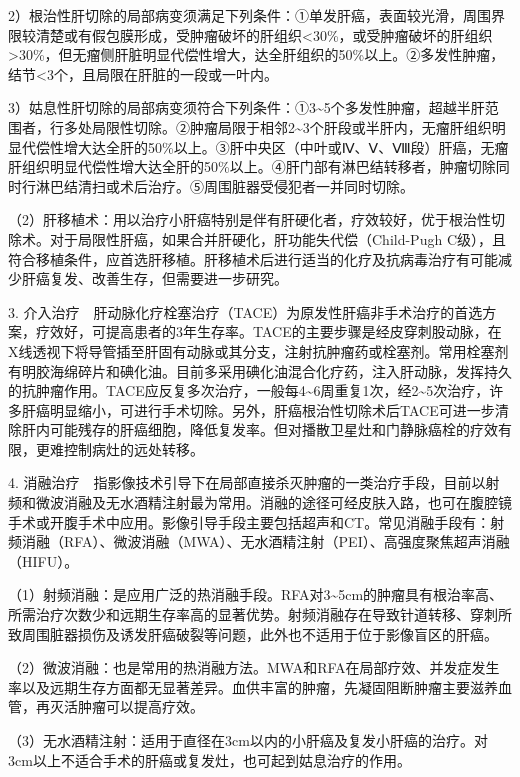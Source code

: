 2）根治性肝切除的局部病变须满足下列条件：①单发肝癌，表面较光滑，周围界限较清楚或有假包膜形成，受肿瘤破坏的肝组织\textless{}30\%，或受肿瘤破坏的肝组织\textgreater{}30\%，但无瘤侧肝脏明显代偿性增大，达全肝组织的50\%以上。②多发性肿瘤，结节\textless{}3个，且局限在肝脏的一段或一叶内。

3）姑息性肝切除的局部病变须符合下列条件：①3\textasciitilde{}5个多发性肿瘤，超越半肝范围者，行多处局限性切除。②肿瘤局限于相邻2\textasciitilde{}3个肝段或半肝内，无瘤肝组织明显代偿性增大达全肝的50\%以上。③肝中央区（中叶或Ⅳ、Ⅴ、Ⅷ段）肝癌，无瘤肝组织明显代偿性增大达全肝的50\%以上。④肝门部有淋巴结转移者，肿瘤切除同时行淋巴结清扫或术后治疗。⑤周围脏器受侵犯者一并同时切除。

（2）肝移植术：用以治疗小肝癌特别是伴有肝硬化者，疗效较好，优于根治性切除术。对于局限性肝癌，如果合并肝硬化，肝功能失代偿（Child-Pugh
C级），且符合移植条件，应首选肝移植。肝移植术后进行适当的化疗及抗病毒治疗有可能减少肝癌复发、改善生存，但需要进一步研究。

3.
介入治疗　肝动脉化疗栓塞治疗（TACE）为原发性肝癌非手术治疗的首选方案，疗效好，可提高患者的3年生存率。TACE的主要步骤是经皮穿刺股动脉，在X线透视下将导管插至肝固有动脉或其分支，注射抗肿瘤药或栓塞剂。常用栓塞剂有明胶海绵碎片和碘化油。目前多采用碘化油混合化疗药，注入肝动脉，发挥持久的抗肿瘤作用。TACE应反复多次治疗，一般每4\textasciitilde{}6周重复1次，经2\textasciitilde{}5次治疗，许多肝癌明显缩小，可进行手术切除。另外，肝癌根治性切除术后TACE可进一步清除肝内可能残存的肝癌细胞，降低复发率。但对播散卫星灶和门静脉癌栓的疗效有限，更难控制病灶的远处转移。

4.
消融治疗　指影像技术引导下在局部直接杀灭肿瘤的一类治疗手段，目前以射频和微波消融及无水酒精注射最为常用。消融的途径可经皮肤入路，也可在腹腔镜手术或开腹手术中应用。影像引导手段主要包括超声和CT。常见消融手段有：射频消融（RFA）、微波消融（MWA）、无水酒精注射（PEI）、高强度聚焦超声消融（HIFU）。

（1）射频消融：是应用广泛的热消融手段。RFA对3\textasciitilde{}5cm的肿瘤具有根治率高、所需治疗次数少和远期生存率高的显著优势。射频消融存在导致针道转移、穿刺所致周围脏器损伤及诱发肝癌破裂等问题，此外也不适用于位于影像盲区的肝癌。

（2）微波消融：也是常用的热消融方法。MWA和RFA在局部疗效、并发症发生率以及远期生存方面都无显著差异。血供丰富的肿瘤，先凝固阻断肿瘤主要滋养血管，再灭活肿瘤可以提高疗效。

（3）无水酒精注射：适用于直径在3cm以内的小肝癌及复发小肝癌的治疗。对3cm以上不适合手术的肝癌或复发灶，也可起到姑息治疗的作用。

